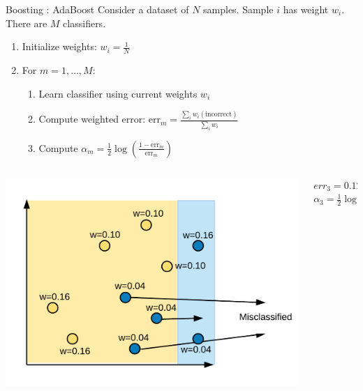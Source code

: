 \documentclass[aspectratio=169,10pt]{beamer}
\newcommand{\fitpic}[1]{\begin{adjustbox}{max width=\linewidth, max totalheight=0.78\textheight}#1\end{adjustbox}}
\begin{document}
\begin{frame}{Boosting : AdaBoost }
  Consider a dataset of $N$ samples. Sample $i$ has weight $w_i$. There are $M$ classifiers.\\[0.3cm]
  \begin{enumerate}
    \item Initialize weights: $w_i = \frac{1}{N}$
    \item For $m = 1, \ldots, M$:
          \begin{enumerate}
            \item Learn classifier using current weights $w_i$
            \item Compute weighted error: $\text{err}_m = \frac{\sum_i w_i(\text{incorrect})}{\sum_i w_i}$
            \item Compute $\alpha_m = \tfrac{1}{2}\log\!\left(\frac{1 - \text{err}_m}{\text{err}_m}\right)$
          \end{enumerate}
  \end{enumerate}
  \begin{columns}
    \begin{column}{0.5\textwidth}\centering
      \fitpic{\includegraphics[width=\textwidth]{../assets/ensemble/diagrams/ada_iter3_misclassify}}
    \end{column}
    \begin{column}{0.5\textwidth}
      $err_3 = 0.12$\\
      $\alpha_3 = \tfrac{1}{2}\log\!\left(\frac{0.88}{0.12}\right) \approx 0.99$
    \end{column}
  \end{columns}
\end{frame}
\end{document}
